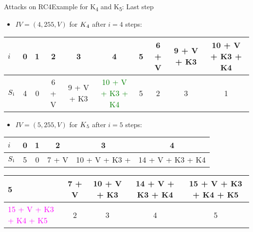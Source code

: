 \documentclass[
	aspectratio=169,	%
	onlytextwidth,		%
	t,					%
	]{beamer}
\begin{document}
\begin{frame}[fragile]{Attacks on RC4}{Example for K\textsubscript{4} and K\textsubscript{5}: Last step}
	\begin{itemize}
		\item $IV = (4,255,V)$ for $K\textsubscript{4}$ after $i=4$ steps:
	\end{itemize}

	\small
	
	\begin{table}[h!]
		\begin{center}
			\begin{tabular}{l|c|c|c|c|c|c|c|c|c}
			$i$ & 0 & 1 & 2 & 3 & 4 & 5 & 6 + V & 9 + V + K3 & 10 + V + K3 + K4\\
			\hline
			$S\textsubscript{i}$ & 4 & 0 & 6 + V & 9 + V + K3 & \textcolor{green}{10 + V + K3 + K4} & 5 & 2 & 3 & 1\\
			\end{tabular}
		\end{center}
	\end{table}

	\normalsize

	\begin{itemize}
		\item $IV = (5,255,V)$ for $K\textsubscript{5}$ after $i=5$ steps:
	\end{itemize}

	\small

	\begin{table}[h!]
		\begin{center}
			\begin{tabular}{l|c|c|c|c|c}
			$i$ & 0 & 1 & 2 & 3 & 4\\
			\hline
			$S\textsubscript{i}$ & 5 & 0 & 7 + V & 10 + V + K3 + & 14 + V + K3 + K4\\
			\end{tabular}
		\end{center}
	\end{table}

	\begin{table}[h!]
		\begin{center}
			\begin{tabular}{l|c|c|c|c}
			5 & 7 + V & 10 + V + K3 & 14 + V + K3 + K4 & 15 + V + K3 + K4 + K5\\
			\hline
			\textcolor{magenta}{15 + V + K3 + K4 + K5} & 2 & 3 & 4 & 5\\
			\end{tabular}
		\end{center}
	\end{table}

	\normalsize

\end{frame}
\end{document}
